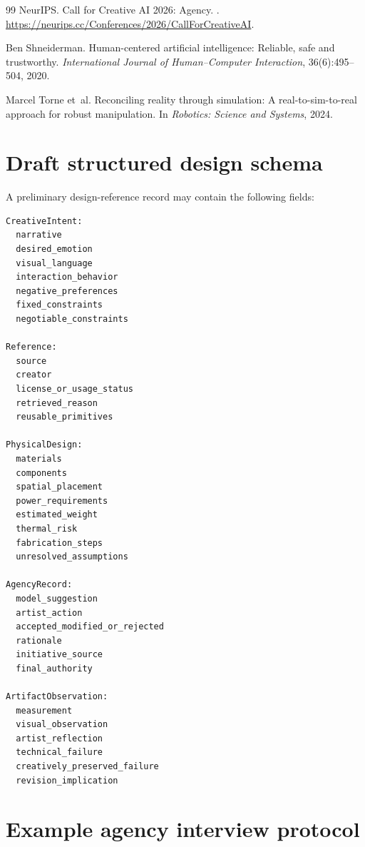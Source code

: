 \documentclass{article}
\begin{document}
{\begin{thebibliography}{99}
NeurIPS.
\newblock Call for Creative AI 2026: Agency.
.
\newblock
\url{https://neurips.cc/Conferences/2026/CallForCreativeAI}.

Ben Shneiderman.
\newblock Human-centered artificial intelligence: Reliable, safe and
trustworthy.
\newblock \emph{International Journal of Human--Computer Interaction},
36(6):495--504, 2020.

Marcel Torne et~al.
\newblock Reconciling reality through simulation: A real-to-sim-to-real
approach for robust manipulation.
\newblock In \emph{Robotics: Science and Systems}, 2024.

\end{thebibliography}

}

\appendix

\section{Draft structured design schema}

A preliminary design-reference record may contain the following fields:

\begin{verbatim}
CreativeIntent:
  narrative
  desired_emotion
  visual_language
  interaction_behavior
  negative_preferences
  fixed_constraints
  negotiable_constraints

Reference:
  source
  creator
  license_or_usage_status
  retrieved_reason
  reusable_primitives

PhysicalDesign:
  materials
  components
  spatial_placement
  power_requirements
  estimated_weight
  thermal_risk
  fabrication_steps
  unresolved_assumptions

AgencyRecord:
  model_suggestion
  artist_action
  accepted_modified_or_rejected
  rationale
  initiative_source
  final_authority

ArtifactObservation:
  measurement
  visual_observation
  artist_reflection
  technical_failure
  creatively_preserved_failure
  revision_implication
\end{verbatim}

\section{Example agency interview protocol}
\end{document}
